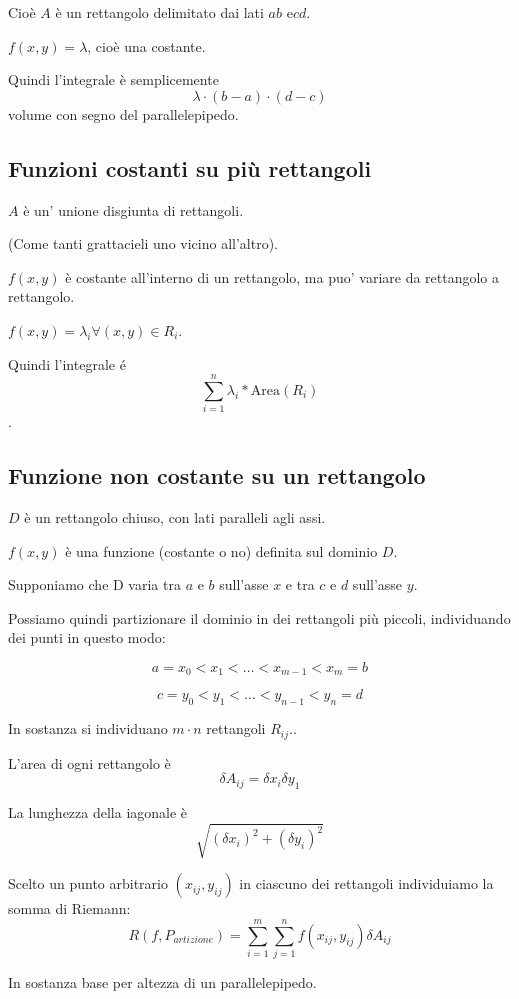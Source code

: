 Cioè $A$ è un rettangolo delimitato dai lati $ab$ e$cd$.

$f(x,y) = \lambda$, cioè una costante.

Quindi l'integrale è semplicemente $$\lambda \cdot (b-a) \cdot (d-c)$$ volume con segno del parallelepipedo.

\subsection{Funzioni costanti su più rettangoli}

$A$ è un' unione disgiunta di rettangoli.

(Come tanti grattacieli uno vicino all'altro).

$f(x,y)$ è costante all'interno di un rettangolo, ma puo' variare da rettangolo a rettangolo.

$f(x,y) = \lambda_i \forall (x,y) \in R_i$.

Quindi l'integrale é $$\sum_{i=1}^{n} \lambda_i * \text{Area}(R_i)$$.

\subsection{Funzione non costante su un rettangolo}

$D$ è un rettangolo chiuso, con lati paralleli agli assi.

$f(x,y)$ è una funzione (costante o no) definita sul dominio $D$.

Supponiamo che D varia tra $a$ e $b$ sull'asse $x$ e tra $c$ e $d$ sull'asse $y$.

Possiamo quindi partizionare il dominio in dei rettangoli più piccoli, individuando dei punti in questo modo:

$$a = x_0 < x_1 < \ldots < x_{m-1} < x_m = b$$


$$c = y_0 < y_1 < \ldots < y_{n-1} < y_n = d$$

In sostanza si individuano $m \cdot n$ rettangoli $R_{ij}$..

L'area di ogni rettangolo è $$\delta A_{ij} = \delta x_i \delta y_1$$

La lunghezza della iagonale è
$$\sqrt{(\delta x_i)^2+(\delta y_i)^2}$$

Scelto un punto arbitrario $(x_{ij},y_{ij})$ in ciascuno dei rettangoli individuiamo la somma di Riemann:
$$R(f,P_{artizione}) = \sum^m_{i=1} \sum^n_{j=1} f(x_{ij},y_{ij}) \delta A_{ij}$$

In sostanza base per altezza di un parallelepipedo.

